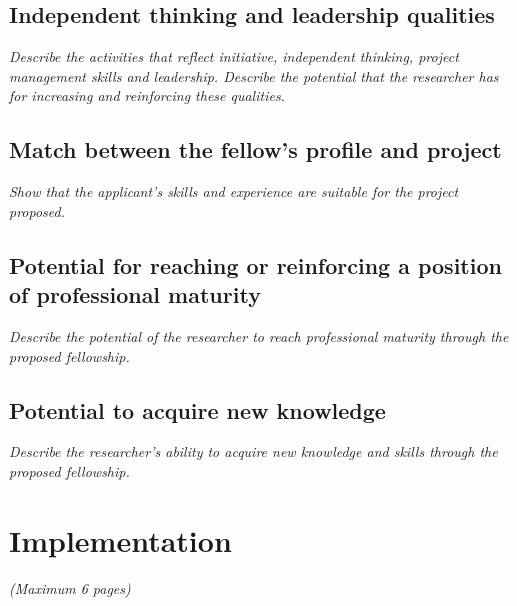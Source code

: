 \documentclass[a4paper,11pt]{article}
\newenvironment{xcomment}{\em}{}
\begin{document}
\subsection{Independent thinking and leadership qualities}
\begin{xcomment}
    Describe the activities that reflect initiative, independent thinking, project management skills and
  leadership. Describe the potential that the researcher has for increasing and reinforcing these
  qualities.
\end{xcomment}

\subsection{Match between the fellow's profile and project}
\begin{xcomment}
 Show that the applicant's skills and experience are suitable for the project proposed.
\end{xcomment}

\subsection{Potential for reaching or reinforcing a position of professional maturity}
\begin{xcomment}
 Describe the potential of the researcher to reach professional maturity through the proposed
fellowship.
\end{xcomment}


\subsection{Potential to acquire new knowledge}
\begin{xcomment}
 Describe the researcher's ability to acquire new knowledge and skills through the proposed
fellowship.
\end{xcomment}

\newpage

\section{Implementation}
\begin{xcomment}  
(Maximum 6 pages)
\end{xcomment}
\end{document}
